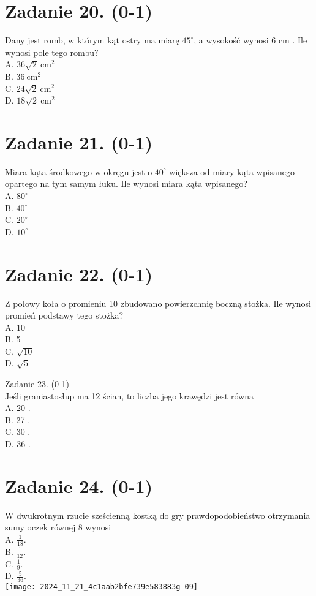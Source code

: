 \documentclass[10pt]{article}
\begin{document}
\section*{Zadanie 20. (0-1)}
Dany jest romb, w którym kąt ostry ma miarę \(45^{\circ}\), a wysokość wynosi 6 cm . Ile wynosi pole tego rombu?\\
A. \(36 \sqrt{2} \mathrm{~cm}^{2}\)\\
B. \(36 \mathrm{~cm}^{2}\)\\
C. \(24 \sqrt{2} \mathrm{~cm}^{2}\)\\
D. \(18 \sqrt{2} \mathrm{~cm}^{2}\)

\section*{Zadanie 21. (0-1)}
Miara kąta środkowego w okręgu jest o \(40^{\circ}\) większa od miary kąta wpisanego opartego na tym samym łuku. Ile wynosi miara kąta wpisanego?\\
A. \(80^{\circ}\)\\
B. \(40^{\circ}\)\\
C. \(20^{\circ}\)\\
D. \(10^{\circ}\)

\section*{Zadanie 22. (0-1)}
Z połowy koła o promieniu 10 zbudowano powierzchnię boczną stożka. Ile wynosi promień podstawy tego stożka?\\
A. 10\\
B. 5\\
C. \(\sqrt{10}\)\\
D. \(\sqrt{5}\)

Zadanie 23. (0-1)\\
Jeśli graniastosłup ma 12 ścian, to liczba jego krawędzi jest równa\\
A. 20 .\\
B. 27 .\\
C. 30 .\\
D. 36 .

\section*{Zadanie 24. (0-1)}
W dwukrotnym rzucie sześcienną kostką do gry prawdopodobieństwo otrzymania sumy oczek równej 8 wynosi\\
A. \(\frac{1}{18}\).\\
B. \(\frac{1}{12}\).\\
C. \(\frac{1}{9}\).\\
D. \(\frac{5}{36}\).\\
\texttt{[image: 2024\_11\_21\_4c1aab2bfe739e583883g-09]}
\end{document}
